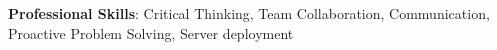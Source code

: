 \item \textbf{Professional Skills}: Critical Thinking, Team Collaboration, Communication, Proactive Problem Solving, Server deployment

